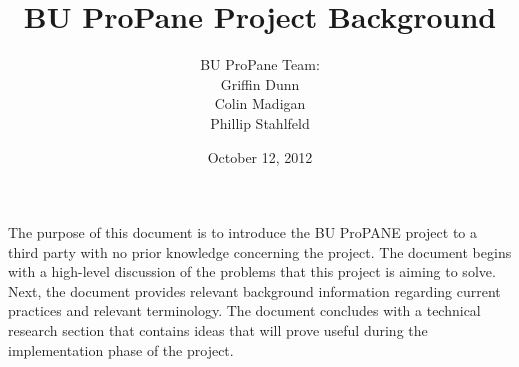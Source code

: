 \documentclass{article}
\begin{document}
	\begin{titlepage}

		\title{\textbf{BU ProPane Project Background}}
		\author{BU ProPane Team:\\Griffin Dunn\\Colin Madigan\\Phillip Stahlfeld}
		\date{October 12, 2012}
		\maketitle
		\noindent
		The purpose of this document is to introduce the BU ProPANE project to a third party with no prior knowledge concerning the project. The document begins with a high-level discussion of the problems that this project is aiming to solve. Next, the document provides relevant background information regarding current practices and relevant terminology. The document concludes with a technical research section that contains ideas that will prove useful during the implementation phase of the project. 
		
		\thispagestyle{empty}
	
		
	\end{titlepage}



	\thispagestyle{empty}
	\tableofcontents
\newpage
\end{document}
